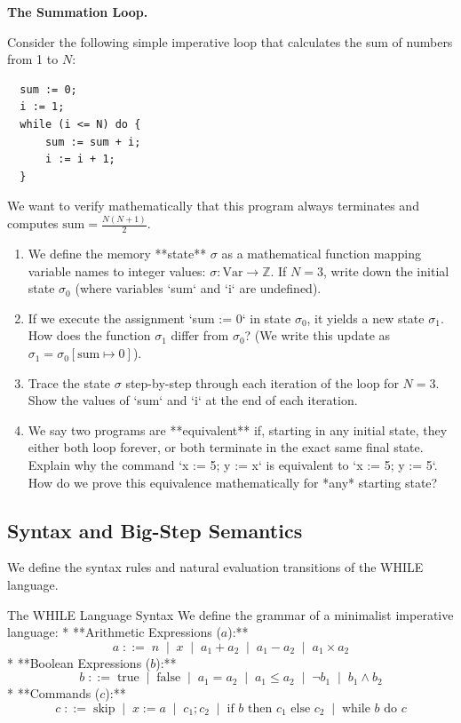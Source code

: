 \documentclass[12pt, a4paper]{book}
\begin{document}
\begin{puzzlebox}
\textbf{The Summation Loop.}

Consider the following simple imperative loop that calculates the sum of numbers from 1 to $N$:
\begin{verbatim}
  sum := 0;
  i := 1;
  while (i <= N) do {
      sum := sum + i;
      i := i + 1;
  }
\end{verbatim}
We want to verify mathematically that this program always terminates and computes $\text{sum} = \frac{N(N+1)}{2}$.
\begin{enumerate}[label=(\alph*), leftmargin=*]
  \item We define the memory **state** $\sigma$ as a mathematical function mapping variable names to integer values: $\sigma: \text{Var} \to \mathbb{Z}$.
        If $N = 3$, write down the initial state $\sigma_0$ (where variables `sum` and `i` are undefined).
  \item If we execute the assignment `sum := 0` in state $\sigma_0$, it yields a new state $\sigma_1$.
        How does the function $\sigma_1$ differ from $\sigma_0$? (We write this update as $\sigma_1 = \sigma_0[\text{sum} \mapsto 0]$).
  \item Trace the state $\sigma$ step-by-step through each iteration of the loop for $N = 3$. Show the values of `sum` and `i` at the end of each iteration.
  \item We say two programs are **equivalent** if, starting in any initial state, they either both loop forever, or both terminate in the exact same final state.
        Explain why the command `x := 5; y := x` is equivalent to `x := 5; y := 5`.
        How do we prove this equivalence mathematically for *any* starting state?
\end{enumerate}
\end{puzzlebox}

\subsection{Syntax and Big-Step Semantics}

We define the syntax rules and natural evaluation transitions of the WHILE language.

\begin{namedconcept}{The WHILE Language Syntax}
We define the grammar of a minimalist imperative language:
* **Arithmetic Expressions ($a$):**
  \[
    a \;::=\; n \;\mid\; x \;\mid\; a_1 + a_2 \;\mid\; a_1 - a_2 \;\mid\; a_1 \times a_2
  \]
* **Boolean Expressions ($b$):**
  \[
    b \;::=\; \text{true} \;\mid\; \text{false} \;\mid\; a_1 = a_2 \;\mid\; a_1 \le a_2 \;\mid\; \neg b_1 \;\mid\; b_1 \land b_2
  \]
* **Commands ($c$):**
  \[
    c \;::=\; \text{skip} \;\mid\; x := a \;\mid\; c_1 ; c_2 \;\mid\; \text{if } b \text{ then } c_1 \text{ else } c_2 \;\mid\; \text{while } b \text{ do } c
  \]
\end{namedconcept}
\end{document}

